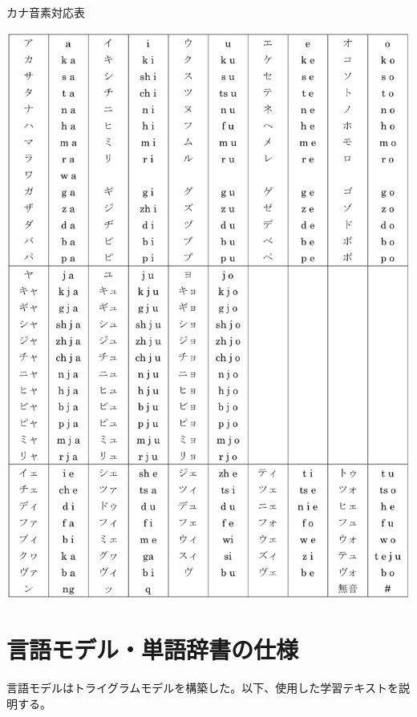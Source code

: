 \begin{table}[H]
  \begin{center}
    \caption{カナ音素対応表 \label{fig:kana_onso}}
    \includegraphics[scale=0.7]{./figure/kana_onso.eps}
  \end{center}
  
\end{table}

\section{言語モデル・単語辞書の仕様}
\label{section:experiment_language_model}
言語モデルはトライグラムモデルを構築した。以下、使用した学習テキストを説明する。

